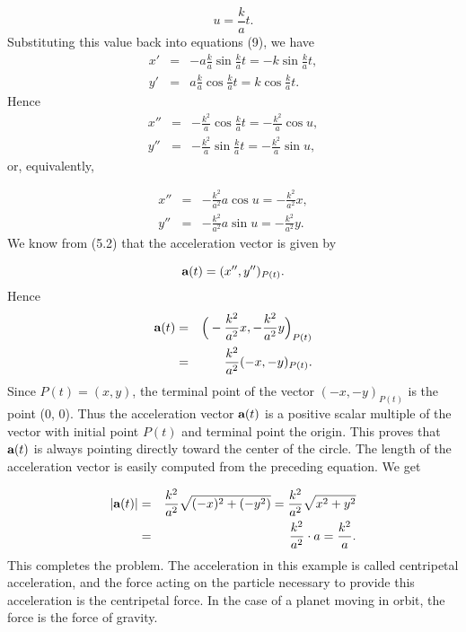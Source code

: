 \begin{example}
$$
u = \frac{k}{a} t .  
$$
Substituting this value back into equations (9), we have 
\begin{eqnarray*}
x' &=& -a \frac{k}{a} \sin \frac{k}{a} t = -k \sin \frac{k}{a} t,\\
y' &=& a \frac{k}{a} \cos \frac{k}{a} t = k \cos \frac{k}{a} t.  
\end{eqnarray*}
Hence
\begin{eqnarray*}
x'' &=& - \frac{k^2}{a} \cos \frac{k}{a} t = - \frac{k^2}{a} \cos u,  \\
y'' &=& - \frac{k^2}{a} \sin \frac{k}{a} t = - \frac{k^2}{a} \sin u,
\end{eqnarray*}
or, equivalently, 

\begin{eqnarray*}
x'' &=& - \frac{k^2}{a^2} a \cos u = - \frac{k^2}{a^2} x,\\
y'' &=& - \frac{k^2}{a^2} a \sin u = - \frac{k^2}{a^2} y.
\end{eqnarray*}
We know from (5.2) that the acceleration vector is given by 

$$
\mbox{\bf{a}}(t) = (x'', y'')_{P(t)} .
$$ 
Hence
\begin{eqnarray*}
\mbox{\bf{a}}(t) &=& \Big( -\frac{k^2}{a^2} x, -\frac{k^2}{a^2} y \Big)_{P(t)} \\
                         &=& \frac{k^2}{a^2} (-x, -y)_{P(t)}. 
\end{eqnarray*}
Since $P(t) = (x,y)$, the terminal point of the vector $(-x,-y)_{P(t)}$ is the point (0, 0). Thus the acceleration vector $\mbox{\bf{a}}(t)$ is a positive scalar multiple of the vector with initial point $P(t)$ and terminal point the origin. This proves that $\mbox{\bf{a}}(t)$ is always pointing directly toward the center of the circle. The length
of the acceleration vector is easily computed from the preceding equation. We get 

\begin{eqnarray*}
|\mbox{\bf{a}}(t)| &=& \frac{k^2}{a^2} \sqrt{(-x)^2 + (-y^2)} 
= \frac{k^2}{a^2} \sqrt{x^2 + y^2} \\
&=& \frac{k^2}{a^2} \cdot a = \frac{k^2}{a} .
\end{eqnarray*}
This completes the problem. The acceleration in this example is called 
centripetal acceleration, and the force acting on the particle necessary to provide this acceleration is the centripetal force. In the case of a planet moving in orbit, the force is the force of gravity.
\end{example}
 
